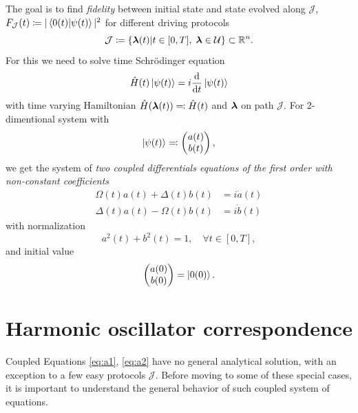 The goal is to find \emph{fidelity} between initial state and state evolved along $\mathcal J$, $F_{\mathcal J}(t)\coloneqq |\braket{0(t)|\psi(t)}|^2$ for different driving protocols \begin{equation}
    \mathcal J\coloneqq\{{\bm\lambda}(t)|t\in[0,T],\; {\bm\lambda}\in \mathcal U\} \subset \mathbb{R}^n.
\end{equation}
For this we need to solve time Schr\"odinger equation
\begin{equation}
    \hat{H}(t)\ket{\psi(t)}=i\frac{\mathrm{d}}{\mathrm{d} t}\ket{\psi(t)}
\end{equation}
with time varying Hamiltonian $\hat{H}({\bm\lambda}(t))\eqqcolon \hat{H}(t)$ and ${\bm\lambda}$ on path $\mathcal J$. For 2-dimentional system with 
\begin{equation}
    \ket{\psi(t)}\eqqcolon \begin{pmatrix}
         a(t) \\
         b(t)    
    \end{pmatrix},
\end{equation}
we get the system of \emph{two coupled differentials equations of the first order with non-constant coefficients}
\begin{align}
    \Omega(t)a(t)+\Delta(t)b(t)&=i\dot a(t)\label{eq:a1}\\
    \Delta(t)a(t)-\Omega(t)b(t)&=i\dot b(t)
    \label{eq:a2}
\end{align}
with normalization
\begin{equation}
    a^2(t)+b^2(t)=1, \quad \forall t\in [0,T],
    \label{eq:normalizationCondition}
\end{equation}
and initial value 
\begin{equation}
    \begin{pmatrix}
        a(0)\\b(0)
    \end{pmatrix} = \ket{0(0)}.
\end{equation}















\section{Harmonic oscillator correspondence}
Coupled Equations \ref{eq:a1}, \ref{eq:a2} have no general analytical solution, with an exception to a few easy protocols $\mathcal J$. Before moving to some of these special cases, it is important to understand the general behavior of such coupled system of equations.

